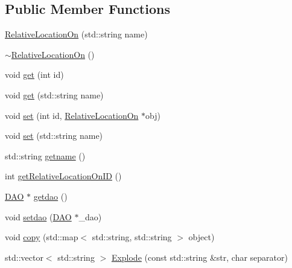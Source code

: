 \subsection*{Public Member Functions}
\begin{DoxyCompactItemize}
\item 
\hyperlink{class_relative_location_on_ad0d81dba1c790be070628c8f51cefe23}{RelativeLocationOn} (std::string name)
\item 
\hyperlink{class_relative_location_on_a676802b4610f00a8b356f24b5193442a}{$\sim$RelativeLocationOn} ()
\item 
void \hyperlink{class_relative_location_on_a99ffe13fe5872cca3370f47d8deae887}{get} (int id)
\item 
void \hyperlink{class_relative_location_on_a6d883f6f937538e2f27a24c2ba12f9c0}{get} (std::string name)
\item 
void \hyperlink{class_relative_location_on_a983c40181c272ed4445b7cc273e1ad0b}{set} (int id, \hyperlink{class_relative_location_on}{RelativeLocationOn} $\ast$obj)
\item 
void \hyperlink{class_relative_location_on_a3314371d4fcabe2d074d8d96f32ee7e1}{set} (std::string name)
\item 
std::string \hyperlink{class_relative_location_on_a8307b4dd51ea5a60d1f737868fd8f4a3}{getname} ()
\item 
int \hyperlink{class_relative_location_on_a9824cc8666e103a4c36b3c7d7b42ef3c}{getRelativeLocationOnID} ()
\item 
\hyperlink{class_d_a_o}{DAO} $\ast$ \hyperlink{class_relative_location_on_a7d019a99bd77570d272e4b209162382d}{getdao} ()
\item 
void \hyperlink{class_relative_location_on_a37515a33b782962408999037a2880654}{setdao} (\hyperlink{class_d_a_o}{DAO} $\ast$\_\-dao)
\item 
void \hyperlink{class_relative_location_on_ae028099fa70ceb40c4851e3852f94e81}{copy} (std::map$<$ std::string, std::string $>$ object)
\item 
std::vector$<$ std::string $>$ \hyperlink{class_relative_location_on_ae6197ea68b2c7f35cc44edfba8c0d087}{Explode} (const std::string \&str, char separator)
\end{DoxyCompactItemize}


